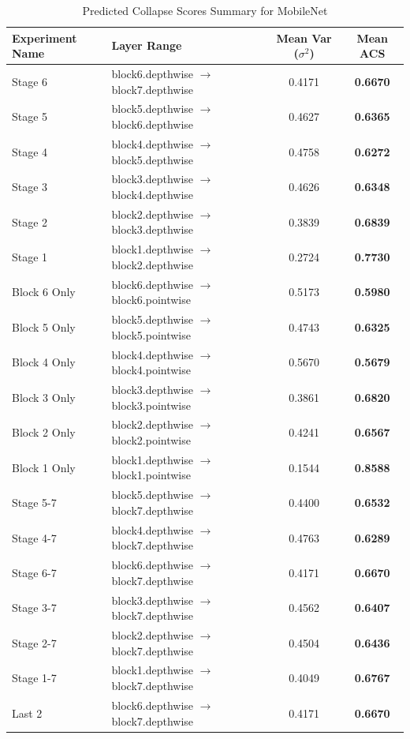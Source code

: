 \begin{table}[h]
\caption{Predicted Collapse Scores Summary for MobileNet}
\label{tab:acs_summary_mobilenet}
\begin{tabular}{llcc}
\toprule
Experiment Name & Layer Range & Mean Var ($\sigma^2$) & Mean ACS \\
\midrule
Stage 6 & block6.depthwise $\to$ block7.depthwise & 0.4171 & \textbf{0.6670} \\
Stage 5 & block5.depthwise $\to$ block6.depthwise & 0.4627 & \textbf{0.6365} \\
Stage 4 & block4.depthwise $\to$ block5.depthwise & 0.4758 & \textbf{0.6272} \\
Stage 3 & block3.depthwise $\to$ block4.depthwise & 0.4626 & \textbf{0.6348} \\
Stage 2 & block2.depthwise $\to$ block3.depthwise & 0.3839 & \textbf{0.6839} \\
Stage 1 & block1.depthwise $\to$ block2.depthwise & 0.2724 & \textbf{0.7730} \\
Block 6 Only & block6.depthwise $\to$ block6.pointwise & 0.5173 & \textbf{0.5980} \\
Block 5 Only & block5.depthwise $\to$ block5.pointwise & 0.4743 & \textbf{0.6325} \\
Block 4 Only & block4.depthwise $\to$ block4.pointwise & 0.5670 & \textbf{0.5679} \\
Block 3 Only & block3.depthwise $\to$ block3.pointwise & 0.3861 & \textbf{0.6820} \\
Block 2 Only & block2.depthwise $\to$ block2.pointwise & 0.4241 & \textbf{0.6567} \\
Block 1 Only & block1.depthwise $\to$ block1.pointwise & 0.1544 & \textbf{0.8588} \\
Stage 5-7 & block5.depthwise $\to$ block7.depthwise & 0.4400 & \textbf{0.6532} \\
Stage 4-7 & block4.depthwise $\to$ block7.depthwise & 0.4763 & \textbf{0.6289} \\
Stage 6-7 & block6.depthwise $\to$ block7.depthwise & 0.4171 & \textbf{0.6670} \\
Stage 3-7 & block3.depthwise $\to$ block7.depthwise & 0.4562 & \textbf{0.6407} \\
Stage 2-7 & block2.depthwise $\to$ block7.depthwise & 0.4504 & \textbf{0.6436} \\
Stage 1-7 & block1.depthwise $\to$ block7.depthwise & 0.4049 & \textbf{0.6767} \\
Last 2 & block6.depthwise $\to$ block7.depthwise & 0.4171 & \textbf{0.6670} \\
\bottomrule
\end{tabular}
\end{table}
